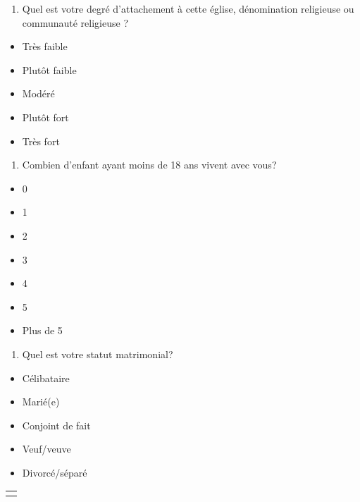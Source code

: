 \documentclass[
  letterpaper,
  DIV=11,
  numbers=noendperiod]{scrreprt}
\providecommand{\tightlist}{%
  \setlength{\itemsep}{0pt}\setlength{\parskip}{0pt}}\usepackage{longtable,booktabs,array}
\begin{document}
\begin{enumerate}
\def\labelenumi{\arabic{enumi}.}
\setcounter{enumi}{8}
\tightlist
\item
  Quel est votre degré d'attachement à cette église, dénomination
  religieuse ou communauté religieuse ?
\end{enumerate}

\begin{itemize}
\tightlist
\item
  Très faible
\item
  Plutôt faible
\item
  Modéré
\item
  Plutôt fort
\item
  Très fort
\end{itemize}

\begin{enumerate}
\def\labelenumi{\arabic{enumi}.}
\setcounter{enumi}{9}
\tightlist
\item
  Combien d'enfant ayant moins de 18 ans vivent avec vous?
\end{enumerate}

\begin{itemize}
\tightlist
\item
  0
\item
  1
\item
  2
\item
  3
\item
  4
\item
  5
\item
  Plus de 5
\end{itemize}

\begin{enumerate}
\def\labelenumi{\arabic{enumi}.}
\setcounter{enumi}{10}
\tightlist
\item
  Quel est votre statut matrimonial?
\end{enumerate}

\begin{itemize}
\tightlist
\item
  Célibataire
\item
  Marié(e)
\item
  Conjoint de fait
\item
  Veuf/veuve
\item
  Divorcé/séparé
\end{itemize}

\begin{longtable}[]{@{}l@{}}
\toprule\noalign{}
\endhead
\bottomrule\noalign{}
\endlastfoot
\end{longtable}
\end{document}
